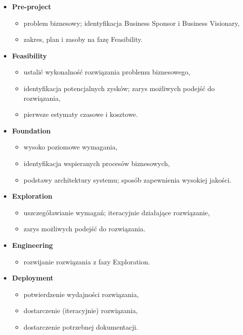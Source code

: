 \documentclass[a4paper]{article}
\begin{document}
    \begin{itemize}
        \item \textbf{Pre-project}
        \begin{itemize}
            \item problem biznesowy; identyfikacja Business Sponsor i Business Visionary,
            \item zakres, plan i zasoby na fazę Feasibility.
        \end{itemize}
        \item \textbf{Feasibility}
        \begin{itemize}
            \item ustalić wykonalność rozwiązania problemu biznesowego,
            \item identyfikacja potencjalnych zysków; zarys możliwych podejść do rozwiązania,
            \item pierwsze estymaty czasowe i kosztowe.
        \end{itemize}
        \item \textbf{Foundation}
        \begin{itemize}
            \item wysoko poziomowe wymagania,
            \item identyfikacja wspieranych procesów biznesowych,
            \item podstawy architektury systemu; sposób zapewnienia wysokiej jakości.
        \end{itemize}
        \item \textbf{Exploration}
        \begin{itemize}
            \item uszczegóławianie wymagań; iteracyjnie działające rozwiązanie,
            \item zarys możliwych podejść do rozwiązania.
        \end{itemize}
        \item \textbf{Engineering}
        \begin{itemize}
            \item rozwijanie rozwiązania z fazy Exploration.
        \end{itemize}
        \item \textbf{Deployment}
        \begin{itemize}
            \item potwierdzenie wydajności rozwiązania,
            \item dostarczenie (iteracyjnie) rozwiązania,
            \item dostarczenie potrzebnej dokumentacji.
        \end{itemize}
    \end{itemize}
\end{document}
